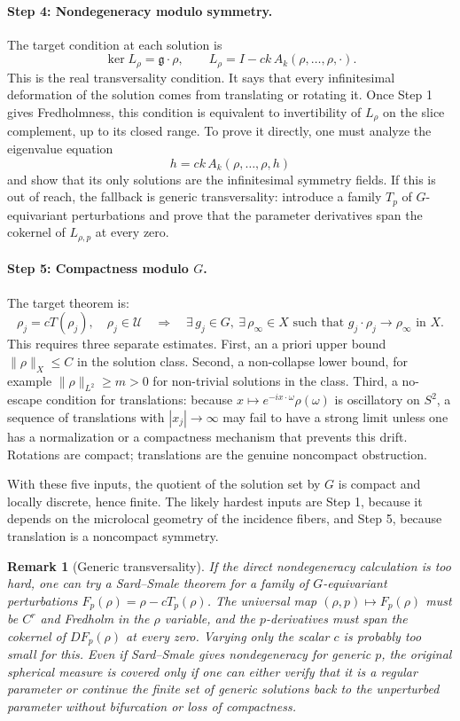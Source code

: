 \documentclass[12pt]{article}
\newtheorem{remark}[theorem]{Remark}
\begin{document}
\paragraph{Step 4: Nondegeneracy modulo symmetry.}
The target condition at each solution is
\[
  \ker L_\rho=\mathfrak g\cdot\rho,
  \qquad
  L_\rho=I-ck\,A_k(\rho,\ldots,\rho,\cdot).
\]
This is the real transversality condition. It says that every infinitesimal
deformation of the solution comes from translating or rotating it. Once Step 1
gives Fredholmness, this condition is equivalent to invertibility of $L_\rho$
on the slice complement, up to its closed range. To prove it directly, one must
analyze the eigenvalue equation
\[
  h=ck\,A_k(\rho,\ldots,\rho,h)
\]
and show that its only solutions are the infinitesimal symmetry fields. If this
is out of reach, the fallback is generic transversality: introduce a family
$T_p$ of $G$-equivariant perturbations and prove that the parameter derivatives
span the cokernel of $L_{\rho,p}$ at every zero.

\paragraph{Step 5: Compactness modulo $G$.}
The target theorem is:
\[
  \rho_j=cT(\rho_j),\quad \rho_j\in\mathcal U
  \quad\Longrightarrow\quad
  \exists\,g_j\in G,\ \exists\,\rho_\infty\in X
  \text{ such that } g_j\cdot\rho_j\to\rho_\infty\text{ in }X.
\]
This requires three separate estimates. First, an a priori upper bound
$\|\rho\|_X\leq C$ in the solution class. Second, a non-collapse lower bound,
for example $\|\rho\|_{L^2}\geq m>0$ for non-trivial solutions in the class.
Third, a no-escape condition for translations: because
$x\mapsto e^{-ix\cdot\omega}\rho(\omega)$ is oscillatory on $S^2$, a sequence
of translations with $|x_j|\to\infty$ may fail to have a strong limit unless
one has a normalization or a compactness mechanism that prevents this drift.
Rotations are compact; translations are the genuine noncompact obstruction.

With these five inputs, the quotient of the solution set by $G$ is compact and
locally discrete, hence finite. The likely hardest inputs are Step 1, because
it depends on the microlocal geometry of the incidence fibers, and Step 5,
because translation is a noncompact symmetry.

\begin{remark}[Generic transversality]
  If the direct nondegeneracy calculation is too hard, one can try a
  Sard--Smale theorem for a family of $G$-equivariant perturbations
  $F_p(\rho)=\rho-cT_p(\rho)$. The universal map
  $(\rho,p)\mapsto F_p(\rho)$ must be $C^r$ and Fredholm in the $\rho$
  variable, and the $p$-derivatives must span the cokernel of
  $DF_p(\rho)$ at every zero. Varying only the scalar $c$ is probably too
  small for this. Even if Sard--Smale gives nondegeneracy for generic $p$, the
  original spherical measure is covered only if one can either verify that it
  is a regular parameter or continue the finite set of generic solutions back
  to the unperturbed parameter without bifurcation or loss of compactness.
\end{remark}
\end{document}
